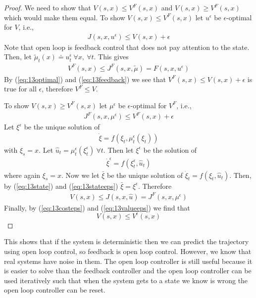 \begin{proof}
We need to show that $V(s,x)\leq V^F(s,x)$ and $V(s,x)\geq V^F(s,x)$ which would make them equal. To show $V(s,x)\leq V^F(s,x)$ let $u^\epsilon$  be $\epsilon$-optimal for $V$, i.e.,
\begin{align}
\label{eq:13optimal}
J(s,x,u^\epsilon) \leq V(s,x) + \epsilon
\end{align}
Note that open loop is feedback control that does not pay attention to the state. Then, let $\tilde{\mu}_t(x) \doteq u_t^\epsilon ~\forall x, ~\forall t$. This gives
\begin{align}
\label{eq:13feedback}
V^F(s,x) \leq J^F(s,x,\tilde{\mu}) = F(s,x,u^\epsilon)
\end{align}
By (\ref{eq:13optimal}) and (\ref{eq:13feedback}) we see that $V^F(s,x)\leq V(s,x)+\epsilon$ is true for all $\epsilon$, therefore $V^F\leq V$.

To show $V(s,x)\geq V^F(s,x)$ let $\mu^\epsilon$ be $\epsilon$-optimal for $V^F$, i.e.,
\begin{align}
\label{eq:13costeps}
J^F(s,x,\mu^\epsilon)\leq V^F(s,x) + \epsilon
\end{align}
Let $\xi^\epsilon$ be the unique solution of
\begin{align}
\label{eq:13state}
\dot{\xi}=f(\xi_t,\mu_t^\epsilon(\xi_t))
\end{align}
with $\xi_s=x$. Let $\hat{u}_t=\mu_t^\epsilon(\xi_t^\epsilon) ~\forall t$. Then let $\xi^\epsilon$ be the solution of
\begin{align}
\label{eq:13stateeps}
\dot{\xi}^\epsilon = f(\xi_t^\epsilon,\hat{u}_t)
\end{align}
where again $\xi_s=x$. Now we let $\bar{\xi}$ be the unique solution of $\dot{\xi}_t=f(\xi_t,\hat{u}_t)$. Then, by (\ref{eq:13state}) and (\ref{eq:13stateeps}) $\bar{\xi}=\xi^\epsilon$. Therefore
\begin{align}
\label{eq:13valueeps}
V(s,x) \leq J(s,x,\hat{u}) = J^F(s,x,\mu^\epsilon)
\end{align}
Finally, by (\ref{eq:13costeps}) and (\ref{eq:13valueeps}) we find that
$$V(s,x) \leq V^\epsilon(s,x)$$
\end{proof}

This shows that if the system is deterministic then we can predict the trajectory using open loop control, so feedback is open loop control. However, we know that real systems have noise in them. The open loop controller is still useful because it is easier to solve than the feedback controller and the open loop controller can be used iteratively such that when the system gets to a state we know is wrong the open loop controller can be reset.

